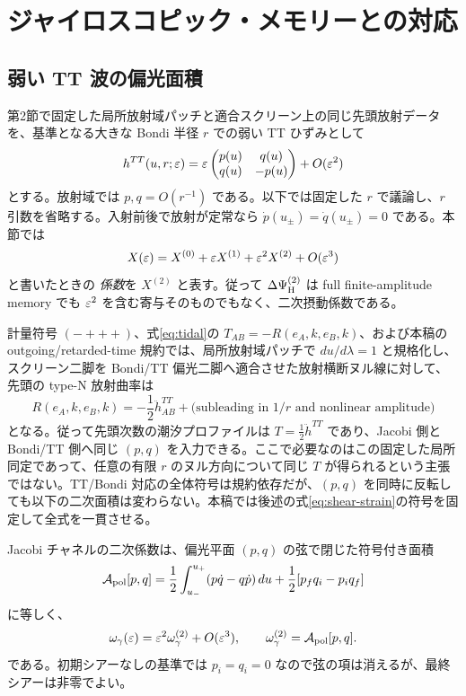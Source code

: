 \section{ジャイロスコピック・メモリーとの対応}
\subsection{弱い TT 波の偏光面積}
第2節で固定した局所放射域パッチと適合スクリーン上の同じ先頭放射データを、基準となる大きな Bondi 半径 $r$ での弱い TT ひずみとして
\begin{equation}
h^{TT}(u,r;\varepsilon)=\varepsilon\begin{pmatrix}p(u)&q(u)\\q(u)&-p(u)\end{pmatrix}+O(\varepsilon^2)
\label{eq:tt}
\end{equation}
とする。放射域では $p,q=O(r^{-1})$ である。以下では固定した $r$ で議論し、$r$ 引数を省略する。入射前後で放射が定常なら $\dot p(u_\pm)=\dot q(u_\pm)=0$ である。本節では
\[
X(\varepsilon)=X^{(0)}+\varepsilon X^{(1)}+\varepsilon^2X^{(2)}+O(\varepsilon^3)
\]
と書いたときの \emph{係数}を $X^{(2)}$ と表す。従って $\Delta\Psi_{\rm H}^{(2)}$ は full finite-amplitude memory でも $\varepsilon^2$ を含む寄与そのものでもなく、二次摂動係数である。

計量符号 $(-+++)$、式\eqref{eq:tidal}の $T_{AB}=-R(e_A,k,e_B,k)$、および本稿の outgoing/retarded-time 規約では、局所放射域パッチで $du/d\lambda=1$ と規格化し、スクリーン二脚を Bondi/TT 偏光二脚へ適合させた放射横断ヌル線に対して、先頭の type-N 放射曲率は
\[
R(e_A,k,e_B,k)=-\frac12\ddot h^{TT}_{AB}
+\text{(subleading in $1/r$ and nonlinear amplitude)}
\]
となる。従って先頭次数の潮汐プロファイルは $T=\frac12\ddot h^{TT}$ であり、Jacobi 側と Bondi/TT 側へ同じ $(p,q)$ を入力できる。ここで必要なのはこの固定した局所同定であって、任意の有限 $r$ のヌル方向について同じ $T$ が得られるという主張ではない。TT/Bondi 対応の全体符号は規約依存だが、$(p,q)$ を同時に反転しても以下の二次面積は変わらない。本稿では後述の式\eqref{eq:shear-strain}の符号を固定して全式を一貫させる。

Jacobi チャネルの二次係数は、偏光平面 $(p,q)$ の弦で閉じた符号付き面積
\begin{equation}
\mathcal A_{\rm pol}[p,q]
=\frac12\int_{u_-}^{u_+}(p\dot q-q\dot p)\,du
+\frac12[p_fq_i-p_iq_f]
\label{eq:area}
\end{equation}
に等しく、
\begin{equation}
\omega_\gamma(\varepsilon)=\varepsilon^2\omega_\gamma^{(2)}+O(\varepsilon^3),
\qquad
\omega_\gamma^{(2)}=\mathcal A_{\rm pol}[p,q].
\label{eq:omega-area}
\end{equation}
である。初期シアーなしの基準では $p_i=q_i=0$ なので弦の項は消えるが、最終シアーは非零でよい。

